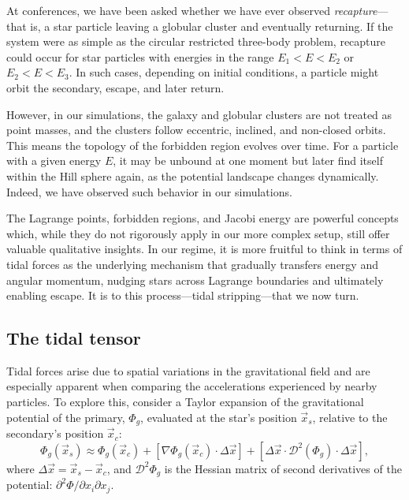         At conferences, we have been asked whether we have ever observed \textit{recapture}—that is, a star particle leaving a globular cluster and eventually returning. If the system were as simple as the circular restricted three-body problem, recapture could occur for star particles with energies in the range \( E_1 < E < E_2 \) or \( E_2 < E < E_3 \). In such cases, depending on initial conditions, a particle might orbit the secondary, escape, and later return.

        However, in our simulations, the galaxy and globular clusters are not treated as point masses, and the clusters follow eccentric, inclined, and non-closed orbits. This means the topology of the forbidden region evolves over time. For a particle with a given energy \( E \), it may be unbound at one moment but later find itself within the Hill sphere again, as the potential landscape changes dynamically. Indeed, we have observed such behavior in our simulations.

        The Lagrange points, forbidden regions, and Jacobi energy are powerful concepts which, while they do not rigorously apply in our more complex setup, still offer valuable qualitative insights. In our regime, it is more fruitful to think in terms of tidal forces as the underlying mechanism that gradually transfers energy and angular momentum, nudging stars across Lagrange boundaries and ultimately enabling escape. It is to this process—tidal stripping—that we now turn.




    \subsection{The tidal tensor}
        
        

        Tidal forces arise due to spatial variations in the gravitational field and are especially apparent when comparing the accelerations experienced by nearby particles. To explore this, consider a Taylor expansion of the gravitational potential of the primary, \(\Phi_g\), evaluated at the star's position \(\vec{x}_s\), relative to the secondary's position \(\vec{x}_c\):
        \begin{equation}
            \Phi_g\left(\vec{x}_s\right) \approx \Phi_g\left(\vec{x}_c\right) + \left[\nabla \Phi_g (\vec{x}_c)\cdot \Delta \vec{x}\right] + \left[\Delta \vec{x} \cdot \mathcal{D}^2\left(\Phi_g\right) \cdot \Delta\vec{x}\right],
        \end{equation}
        where \(\Delta \vec{x} = \vec{x}_s - \vec{x}_c\), and \(\mathcal{D}^2 \Phi_g\) is the Hessian matrix of second derivatives of the potential: \(\partial^2 \Phi/\partial x_i \partial x_j\).

